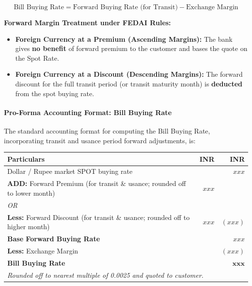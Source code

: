 \begin{equation}
    \text{Bill Buying Rate} = \text{Forward Buying Rate (for Transit)} - \text{Exchange Margin}
\end{equation}

\noindent\textbf{Forward Margin Treatment under FEDAI Rules:}
\begin{itemize}[leftmargin=*]
    \item \textbf{Foreign Currency at a Premium (Ascending Margins):} The bank gives \textbf{no benefit} of forward premium to the customer and bases the quote on the Spot Rate.
    \item \textbf{Foreign Currency at a Discount (Descending Margins):} The forward discount for the full transit period (or transit maturity month) is \textbf{deducted} from the spot buying rate.
\end{itemize}

\paragraph{Pro-Forma Accounting Format: Bill Buying Rate}
The standard accounting format for computing the Bill Buying Rate, incorporating transit and usance period forward adjustments, is:

\begin{center}
\small
\begin{tabularx}{0.95\linewidth}{Xrr}
\toprule
\textbf{Particulars} & \textbf{INR} & \textbf{INR} \\
\midrule
Dollar / Rupee market SPOT buying rate & & $xxx$ \\
\textbf{ADD:} Forward Premium (for transit \& usance; rounded off to lower month) & $xxx$ & \\
\quad \textit{OR} & & \\
\textbf{Less:} Forward Discount (for transit \& usance; rounded off to higher month) & $xxx$ & $(xxx)$ \\
\midrule
\textbf{Base Forward Buying Rate} & & $xxx$ \\
\textbf{Less:} Exchange Margin & & $(xxx)$ \\
\midrule
\textbf{Bill Buying Rate} & & $\mathbf{xxx}$ \\
\bottomrule
\multicolumn{3}{l}{\footnotesize\textit{Rounded off to nearest multiple of 0.0025 and quoted to customer.}}
\end{tabularx}
\end{center}

